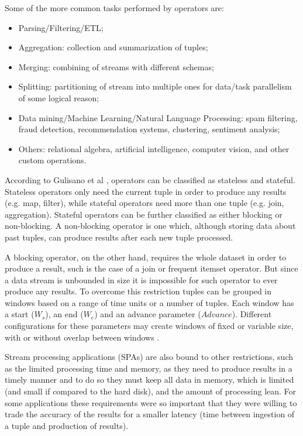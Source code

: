 \documentclass[ppgc,diss,english]{iiufrgs}
\begin{document}
Some of the more common tasks performed by operators are:

\begin{itemize}
\item Parsing/Filtering/ETL;
\item Aggregation: collection and summarization of tuples;
\item Merging: combining of streams with different schemas;
\item Splitting: partitioning of stream into multiple ones for data/task parallelism of some logical reason;
\item Data mining/Machine Learning/Natural Language Processing: spam filtering, fraud detection, recommendation systems, clustering, sentiment analysis;
\item Others: relational algebra, artificial intelligence, computer vision, and other custom operations.
\end{itemize}

According to Gulisano et al \cite{gulisano2010streamcloud}, operators can be classified as stateless and stateful. Stateless operators only need the current tuple in order to produce any results (e.g. map, filter), while stateful operators need more than one tuple (e.g. join, aggregation). Stateful operators can be further classified as either blocking or non-blocking. A non-blocking operator is one which, although storing data about past tuples, can produce results after each new tuple processed.

A blocking operator, on the other hand, requires the whole dataset in order to produce a result, such is the case of a join or frequent itemset operator. But since a data stream is unbounded in size it is impossible for such operator to ever produce any results. To overcome this restriction tuples can be grouped in windows based on a range of time units or a number of tuples. Each window has a start ($W_s$), an end ($W_e$) and an advance parameter ($Advance$). Different configurations for these parameters may create windows of fixed or variable size, with or without overlap between windows \cite{gulisano2012streamcloud}.

Stream processing applications (SPAs) are also bound to other restrictions, such as the limited processing time and memory, as they need to produce results in a timely manner and to do so they must keep all data in memory, which is limited (and small if compared to the hard disk), and the amount of processing lean. For some applications these requirements were so important that they were willing to trade the accuracy of the results for a smaller latency (time between ingestion of a tuple and production of results).
\end{document}

